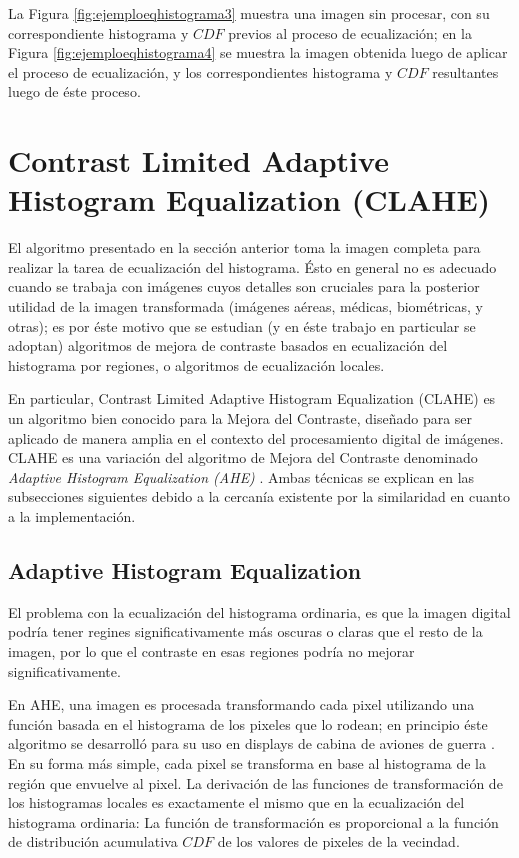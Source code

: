 La Figura \ref{fig:ejemploeqhistograma3} muestra una imagen sin procesar, con su correspondiente histograma y $CDF$ previos al proceso de ecualización; en la Figura \ref{fig:ejemploeqhistograma4} se muestra la imagen obtenida luego de aplicar el proceso de ecualización, y los correspondientes histograma y $CDF$ resultantes luego de éste proceso. 

\section{Contrast Limited Adaptive Histogram Equalization (CLAHE)}\label{sec:clahe}

El algoritmo presentado en la sección anterior toma la imagen completa para realizar la tarea de ecualización del histograma. Ésto en general no es adecuado cuando se trabaja con imágenes cuyos detalles son cruciales para la posterior utilidad de la imagen transformada (imágenes aéreas, médicas, biométricas, y otras); es por éste motivo que se estudian (y en éste trabajo en particular se adoptan) algoritmos de mejora de contraste basados en ecualización del histograma por regiones, o algoritmos de ecualización locales.

En particular, Contrast Limited Adaptive Histogram Equalization (CLAHE) \cite{zuiderveld1994contrast} es un algoritmo bien conocido para la Mejora del Contraste, diseñado para ser aplicado de manera amplia en el contexto del procesamiento digital de imágenes. CLAHE es una variación del algoritmo de Mejora del Contraste denominado \textit{Adaptive Histogram Equalization (AHE)} \cite{pizer1987adaptive}. Ambas técnicas se explican en las subsecciones siguientes debido a la cercanía existente por la similaridad en cuanto a la implementación.

\subsection{Adaptive Histogram Equalization}\label{sec:definicionclahe}

El problema con la ecualización del histograma ordinaria, es que la imagen digital podría tener regines significativamente más oscuras o claras que el resto de la imagen, por lo que el contraste en esas regiones podría no mejorar significativamente.

En AHE, una imagen es procesada transformando cada pixel utilizando una función basada en el histograma de los pixeles que lo rodean; en principio éste algoritmo se desarrolló para su uso en displays de cabina de aviones de guerra \cite{ketcham1974image}. En su forma más simple, cada pixel se transforma en base al histograma de la región que envuelve al pixel. La derivación de las funciones de transformación de los histogramas locales es exactamente el mismo que en la ecualización del histograma ordinaria: La función de transformación es proporcional a la función de distribución acumulativa $CDF$ de los valores de pixeles de la vecindad. 

